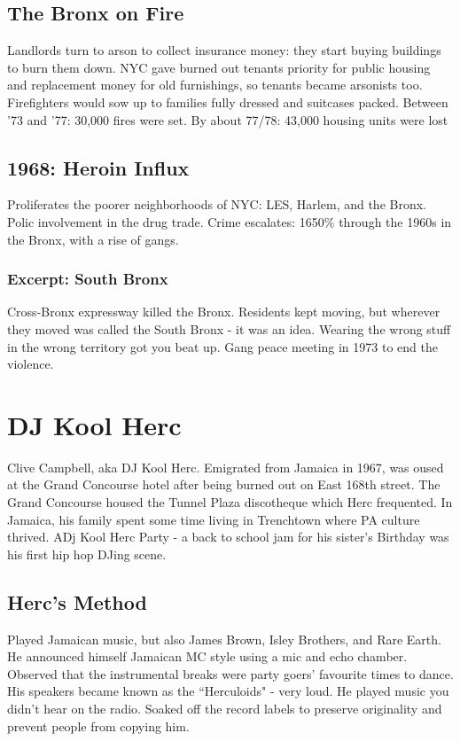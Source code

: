 \documentclass[12pt, a4paper, twoside, openright, titlepage]{book}
\begin{document}
\subsection{The Bronx on Fire}

Landlords turn to arson to collect insurance money: they start buying buildings to burn them down. NYC gave burned out tenants priority for public housing and replacement money for old furnishings, so tenants became arsonists too. Firefighters would sow up to families fully dressed and suitcases packed. Between '73 and '77: 30,000 fires were set. By about 77/78: 43,000 housing units were lost

\subsection{1968: Heroin Influx}

Proliferates the poorer neighborhoods of NYC: LES, Harlem, and the Bronx. Polic involvement in the drug trade. Crime escalates: 1650\% through the 1960s in the Bronx, with a rise of gangs.

\subsubsection{Excerpt: South Bronx}

Cross-Bronx expressway killed the Bronx. Residents kept moving, but wherever they moved was called the South Bronx - it was an idea. Wearing the wrong stuff in the wrong territory got you beat up. Gang peace meeting in 1973 to end the violence.


\section{DJ Kool Herc}

Clive Campbell, aka DJ Kool Herc. Emigrated from Jamaica in 1967, was oused at the Grand Concourse hotel after being burned out on East 168th street. The Grand Concourse housed the Tunnel Plaza discotheque which Herc frequented. In Jamaica, his family spent some time living in Trenchtown where PA culture thrived. ADj Kool Herc Party - a back to school jam for his sister's Birthday was his first hip hop DJing scene.


\subsection{Herc's Method}

Played Jamaican music, but also James Brown, Isley Brothers, and Rare Earth. He announced himself Jamaican MC style using a mic and echo chamber. Observed that the instrumental breaks were party goers' favourite times to dance. His speakers became known as the ``Herculoids" - very loud. He played music you didn't hear on the radio. Soaked off the record labels to preserve originality and prevent people from copying him.
\end{document}
